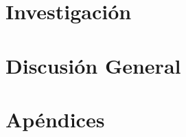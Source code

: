 \documentclass[%
    paper=A4,               %
    twoside=true,           %
    openright,              %
    parskip=half,           %
    chapterprefix=true,     %
    12pt,                   %
    headings=normal,        %
    bibliography=totoc,     %
    listof=totoc,           %
    titlepage=on,           %
    captions=tableabove,    %
    chapterprefix=false,    %
    appendixprefix=false,    %
    draft=false,            %
]{scrreprt}%
\begin{document}
\part{Investigación}
   
  
 
 
   
 

\part{Discusión General}
       

%
{%
\renewcommand{\bibfont}{\scriptsize}
\setlength{\biblabelsep}{0pt}
\setlength{\bibhang}{.5\bibhang}
\setlength{\bibitemsep}{0.1\baselineskip plus 0.1\baselineskip}
\printbibliography
}%
\cleardoublepage




\part{Apéndices}
\appendix\cleardoublepage

\cleardoublepage



\newpage
\mbox{}

\end{document}
